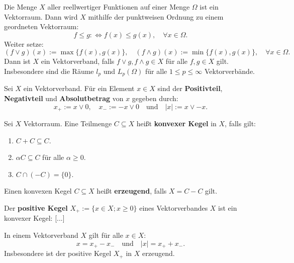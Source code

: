 \begin{bsp}
Die Menge $X$ aller reellwertiger Funktionen auf einer Menge $\Omega$ ist ein Vektorraum. Dann wird $X$ mithilfe der punktweisen Ordnung zu einem geordneten Vektorraum: 
\begin{equation}
f\leq g:\iff f(x)\leq g(x),\quad\forall x\in \Omega.
\end{equation}
Weiter setze:
\begin{equation*}
(f\vee g)(x):=\max\{f(x), g(x)\},\quad (f\wedge g)(x):=\min\{f(x), g(x)\},\quad\forall x\in\Omega.
\end{equation*}
Dann ist $X$ ein Vektorverband, falls $f\vee g, f\wedge g\in X$ für alle $f,g\in X$ gilt. Insbesondere sind die Räume $l_p$ und $L_p(\Omega)$ für alle $1\leq p\leq\infty$ Vektorverbände.
\end{bsp}

\begin{defi}
Sei $X$ ein Vektorverband. Für ein Element $x\in X$ sind der  \textbf{Positivteil}, \textbf{Negativteil} und \textbf{Absolutbetrag} von $x$ gegeben durch:
\begin{equation*}
x_+ :=x\vee 0,\quad x_- :=-x \vee 0\quad \text{und} \quad |x| :=x \vee -x.
\end{equation*}
\end{defi}

\begin{defi}
Sei $X$ Vektorraum. Eine Teilmenge $C\subseteq X$ heißt \textbf{konvexer Kegel} in $X$, falls gilt:
\begin{enumerate}
\item $C+C\subseteq C$.
\item $\alpha C\subseteq C$ für alle $\alpha\geq0$.
\item $C\cap(-C)=\{0\}$.
\end{enumerate}
Einen konvexen Kegel $C\subseteq X$ heißt \textbf{erzeugend}, falls $X=C-C$ gilt.
\end{defi}

\begin{bsp}
Der \textbf{positive Kegel} $X_+:=\{x\in X; x\geq 0\}$ eines Vektorverbandes $X$ ist ein konvexer Kegel: [...]
\end{bsp}

\begin{prop}
In einem Vektorverband $X$ gilt für alle $x\in X$:
\begin{equation*}
x = x_+ - x_-\quad \text{und}\quad |x| = x_+ + x_-.
\end{equation*}
Insbesondere ist der positive Kegel $X_+$ in $X$ erzeugend.
\end{prop}

